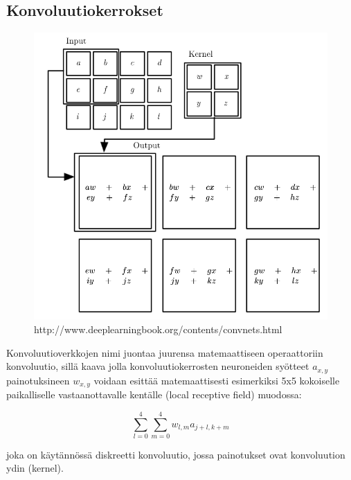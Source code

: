 \documentclass[finnish]{tktltiki2}
\theoremstyle{definition}
\theoremstyle{remark}
\begin{document}

    \subsection{Konvoluutiokerrokset}
    
    \begin{figure}[h]
    \label{pic:convolution}
    \centering
    \includegraphics[scale=0.4]{convolution}
    \caption{http://www.deeplearningbook.org/contents/convnets.html}
    \end{figure}

    Konvoluutioverkkojen nimi juontaa juurensa matemaattiseen operaattoriin konvoluutio, sillä kaava jolla konvoluutiokerrosten neuroneiden syötteet $a_{x,y}$ painotuksineen $w_{x,y}$ voidaan esittää matemaattisesti esimerkiksi 5x5 kokoiselle paikalliselle vastaanottavalle kentälle (local receptive field) muodossa:

    $$ \sum_{l=0}^{4}\sum_{m=0}^{4} w_{l,m}a_{j+l,k+m}$$
    
      joka on käytännössä diskreetti konvoluutio, jossa painotukset ovat konvoluution ydin (kernel).
\end{document}
